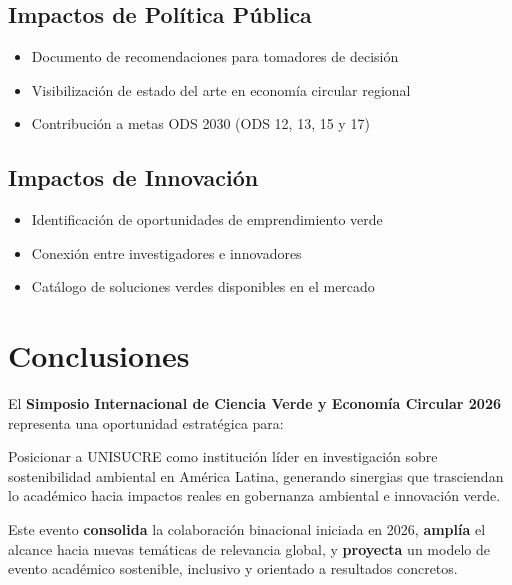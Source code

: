 \documentclass[12pt,a4paper]{article}
\begin{document}
\subsection{Impactos de Política Pública}

\begin{itemize}[label={\textcolor{verdeosc}{\textbullet}}]
  \item Documento de recomendaciones para tomadores de decisión
  \item Visibilización de estado del arte en economía circular regional
  \item Contribución a metas ODS 2030 (ODS 12, 13, 15 y 17)
\end{itemize}

\subsection{Impactos de Innovación}

\begin{itemize}[label={\textcolor{verdeosc}{\textbullet}}]
  \item Identificación de oportunidades de emprendimiento verde
  \item Conexión entre investigadores e innovadores
  \item Catálogo de soluciones verdes disponibles en el mercado
\end{itemize}

\section{Conclusiones}

El \textbf{Simposio Internacional de Ciencia Verde y Economía Circular 2026} representa una oportunidad estratégica para:

\begin{tcolorbox}[cajainfo, title=Propuesta integral]
Posicionar a UNISUCRE como institución líder en investigación sobre sostenibilidad ambiental en América Latina, generando sinergias que trasciendan lo académico hacia impactos reales en gobernanza ambiental e innovación verde.
\end{tcolorbox}

Este evento \textbf{consolida} la colaboración binacional iniciada en 2026, \textbf{amplía} el alcance hacia nuevas temáticas de relevancia global, y \textbf{proyecta} un modelo de evento académico sostenible, inclusivo y orientado a resultados concretos.
\end{document}
